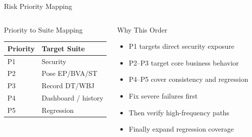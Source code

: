 \begin{frame}{Risk Priority Mapping}
    \begin{columns}[T]
        \footnotesize
        \begin{block}{Priority to Suite Mapping}
            \begin{tabular}{@{}ll@{}}
                \toprule
                \textbf{Priority} & \textbf{Target Suite} \\ \midrule
                P1 & Security \\
                P2 & Pose EP/BVA/ST \\
                P3 & Record DT/WBJ \\
                P4 & Dashboard / history \\
                P5 & Regression \\
                \bottomrule
            \end{tabular}
        \end{block}

        \footnotesize
        \begin{block}{Why This Order}
            \begin{itemize}
                \setlength{\itemsep}{0.2em}
                \item P1 targets direct security exposure
                \item P2--P3 target core business behavior
                \item P4--P5 cover consistency and regression
            \end{itemize}
            \begin{itemize}
                \setlength{\itemsep}{0.2em}
                \item Fix severe failures first
                \item Then verify high-frequency paths
                \item Finally expand regression coverage
            \end{itemize}
        \end{block}
    \end{columns}
\end{frame}

